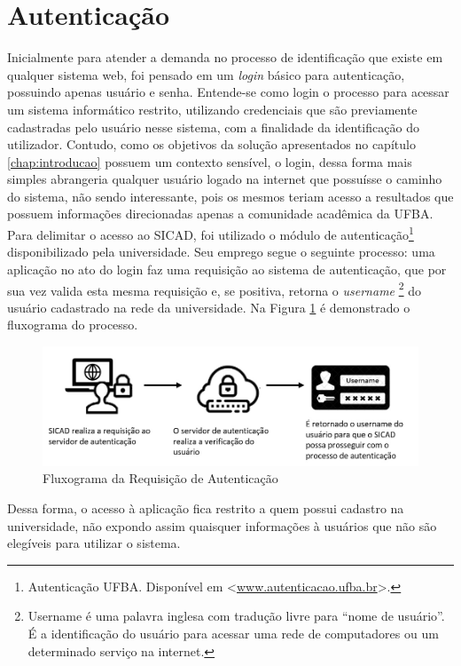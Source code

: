 \documentclass[12pt, a4paper]{report}
\begin{document}
\section{Autenticação}
Inicialmente para atender a demanda no processo de identificação que existe em qualquer sistema web, foi pensado em um \textit{login} básico para autenticação, possuindo apenas usuário e senha. Entende-se como login o processo para acessar um sistema informático restrito, utilizando credenciais que são previamente cadastradas pelo usuário nesse sistema, com a finalidade da identificação do utilizador. Contudo, como os objetivos da solução apresentados no capítulo \ref{chap:introducao} possuem um contexto sensível, o login, dessa forma mais simples abrangeria qualquer usuário logado na internet que possuísse o caminho do sistema, não sendo interessante, pois os mesmos teriam acesso a resultados que possuem informações direcionadas apenas a comunidade acadêmica da UFBA.
Para delimitar o acesso ao \ac{SICAD}, foi utilizado o módulo de autenticação\footnote{Autenticação UFBA. Disponível em <\url{www.autenticacao.ufba.br}>.} disponibilizado pela universidade. Seu emprego segue o seguinte processo: uma aplicação no ato do login faz uma requisição ao sistema de autenticação, que por sua vez valida esta mesma requisição e, se positiva, retorna o \textit{username} \footnote{Username é uma palavra inglesa com tradução livre para “nome de usuário”. É a identificação do usuário para acessar uma rede de computadores ou um determinado serviço na internet.} do usuário cadastrado na rede da universidade. Na Figura \ref{fig:processo_autenticacao} é demonstrado o fluxograma do processo.

\begin{figure}
\centering
\includegraphics[scale=0.50]{processo_autenticacao.jpg}
\caption{Fluxograma da Requisição de Autenticação}
\label{fig:processo_autenticacao}
\end{figure}

Dessa forma, o acesso à aplicação fica restrito a quem possui cadastro na universidade, não expondo assim quaisquer informações à usuários que não são elegíveis para utilizar o sistema.
\end{document}
